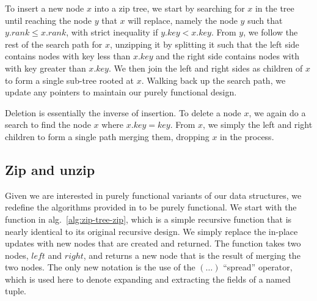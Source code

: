 \documentclass{article}
\begin{document}
To insert a new node $x$ into a zip tree, we start by searching for $x$ in the tree until reaching the node $y$ that $x$ will replace, namely the node $y$ such that $y.rank \leq x.rank$, with strict inequality if $y.key < x.key$. From $y$, we follow the rest of the search path for $x$, unzipping it by splitting it such that the left side contains nodes with key less than $x.key$ and the right side contains nodes with with key greater than $x.key$. We then join the left and right sides as children of $x$ to form a single sub-tree rooted at $x$. Walking back up the search path, we update any pointers to maintain our purely functional design.

Deletion is essentially the inverse of insertion. To delete a node $x$, we again do a search to find the node $x$ where $x.key = key$. From $x$, we simply \zip the left and right children to form a single path merging them, dropping $x$ in the process.


\subsection{Zip and unzip}

Given we are interested in purely functional variants of our data structures, we redefine the algorithms provided in \cite{tarjan2021zip} to be purely functional. We start with the \zip function in alg.~\ref{alg:zip-tree-zip}, which is a simple recursive function that is nearly identical to its original recursive design. We simply replace the in-place updates with new nodes that are created and returned. The \zip function takes two nodes, $left$ and $right$, and returns a new node that is the result of merging the two nodes. The only new notation is the use of the $(\ldots)$ ``spread'' operator, which is used here to denote expanding and extracting the fields of a named tuple.

\begin{algorithm}[!htb]
    \caption{Purely functional zip}\label{alg:zip-tree-zip}
    \DontPrintSemicolon

\end{algorithm}
\end{document}

